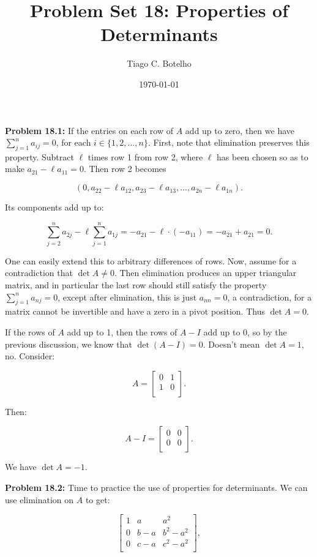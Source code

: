 \documentclass{article}
\title{Problem Set 18: Properties of Determinants}
\author{Tiago C. Botelho}
\date{\today}
\begin{document}
\maketitle

\noindent \textbf{Problem 18.1:} If the entries on each row of $A$ add up to zero, then we have $\sum_{j = 1}^{n} a_{ij} = 0$, for each $i \in \{1, 2, ..., n\}$. First, note that elimination preserves this property. Subtract $\ell$ times row 1 from row 2, where $\ell$ has been chosen so as to make $a_{21} - \ell a_{11} = 0$. Then row 2 becomes 

\[
(0, a_{22} - \ell a_{12}, a_{23} - \ell a_{13}, ..., a_{2n} - \ell a_{1n}).
\]

Its components add up to:

\[
\sum_{j=2}^{n} a_{2j} - \ell \sum_{j=1}^{n} a_{1j} = -a_{21} -\ell \cdot (-a_{11}) = -a_{21} + a_{21} = 0.
\]

One can easily extend this to arbitrary differences of rows. Now, assume for a contradiction that $\det A \neq 0$. Then elimination produces an upper triangular matrix, and in particular the last row should still satisfy the property $\sum_{j=1}^{n} a_{nj} = 0$, except after elimination, this is just $a_{nn} = 0$, a contradiction, for a matrix cannot be invertible and have a zero in a pivot position. Thus $\det A = 0$.

If the rows of $A$ add up to 1, then the rows of $A - I$ add up to 0, so by the previous discussion, we know that $\det (A - I) = 0$. Doesn't mean $\det A = 1$, no. Consider:

\[
A = \begin{bmatrix}
0 & 1\\
1 & 0\\
\end{bmatrix}.
\]

Then:

\[
A - I = \begin{bmatrix}
0 & 0\\
0 & 0\\
\end{bmatrix}.
\]

We have $\det A = -1$.

\noindent \textbf{Problem 18.2:} Time to practice the use of properties for determinants. We can use elimination on $A$ to get:

\[
\begin{bmatrix}
1 & a & a^{2}\\
0 & b - a & b^{2} - a^{2}\\
0 & c - a & c^{2} - a^{2}\\
\end{bmatrix},
\]
\end{document}
